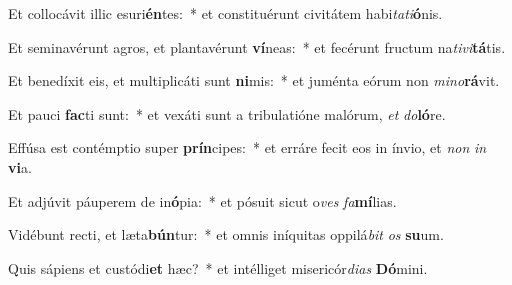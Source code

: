 \item Et collocávit illic esuri\textbf{én}tes:~* et constituérunt civitátem habi\textit{ta}\textit{ti}\textbf{ó}nis.
\item Et seminavérunt agros, et plantavérunt \textbf{ví}neas:~* et fecérunt fructum na\textit{ti}\textit{vi}\textbf{tá}tis.
\item Et benedíxit eis, et multiplicáti sunt \textbf{ni}mis:~* et juménta eórum non \textit{mi}\textit{no}\textbf{rá}vit.
\item Et pauci \textbf{fac}ti sunt:~* et vexáti sunt a tribulatióne malórum, \textit{et} \textit{do}\textbf{ló}re.
\item Effúsa est contémptio super \textbf{prín}cipes:~* et erráre fecit eos in ínvio, et \textit{non} \textit{in} \textbf{vi}a.
\item Et adjúvit páuperem de in\textbf{ó}pia:~* et pósuit sicut o\textit{ves} \textit{fa}\textbf{mí}lias.
\item Vidébunt recti, et læta\textbf{bún}tur:~* et omnis iníquitas oppilá\textit{bit} \textit{os} \textbf{su}um.
\item Quis sápiens et custódi\textbf{et} hæc?~* et intélliget misericór\textit{di}\textit{as} \textbf{Dó}mini.
